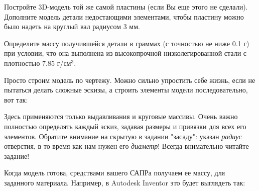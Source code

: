 
Постройте 3D-модель той же самой пластины (если Вы еще этого не сделали).   Дополните модель детали недостающими элементами,  чтобы пластину можно было надеть на круглый вал радиусом 3 мм.


Определите массу получившейся детали в граммах (с точностью не ниже 0.1 г) при условии, что она выполнена из высокопрочной низколегированной стали с плотностью 7.85 г/см$^3$.

\solutionSection

Просто строим модель по чертежу.  Можно сильно упростить себе жизнь, если не пытаться делать сложные эскизы, а строить элементы модели последовательно, вот так:


Здесь применяются только выдавливания и круговые массивы. Очень важно полностью определять каждый эскиз, задавая размеры и привязки для всех его элементов.  Обратите внимание на скрытую в задании "засаду":  указан \textit{радиус} отверстия, в то время как нам нужен его \textit{диаметр}!  Всегда внимательно читайте задание!

Когда модель готова, средствами вашего САПРа получаем ее массу, для заданного материала. Например, в Autodesk Inventor это будет выглядеть так:


